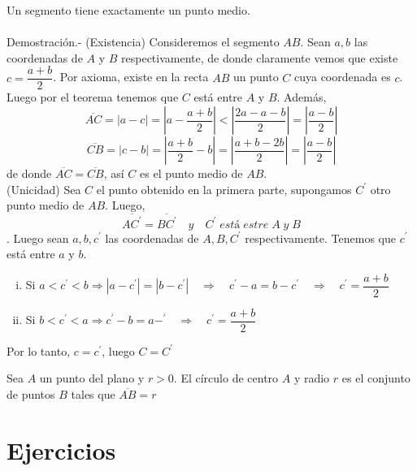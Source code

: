     \begin{teo}
	Un segmento tiene exactamente un punto medio.\\\\
	    Demostración.-\; (Existencia) Consideremos el segmento $AB$. Sean $a,b$ las coordenadas de $A$ y $B$ respectivamente, de donde claramente vemos que existe $c=\dfrac{a+b}{2}$. Por axioma, existe en la recta $AB$ un punto $C$ cuya coordenada es $c$. Luego por el teorema tenemos que $C$ está entre $A$ y $B$. Además, 
	    $$\overline{AC}=|a-c| = \left| a - \dfrac{a+b}{2}\right| < \left| \dfrac{2a - a -b}{2}\right| = \left| \dfrac{a-b}{2} \right|$$
	    $$\overline{CB} = |c-b| = \left| \dfrac{a+b}{2} - b \right| = \left| \dfrac{a+b-2b}{2} \right| = \left| \dfrac{a-b}{2}\right|$$ de donde $\overline{AC} = \overline{CB}$, así $C$ es el punto medio de $AB$.\\
	    (Unicidad) Sea $C$ el punto obtenido en la primera parte, supongamos $C^{'}$ otro punto medio de $AB$. Luego, $$\overline{AC^{'}} = \overline{BC^{'}} \quad y \quad C^{'} \; está \; estre \; A \; y \;B$$.
	    Luego sean $a,b,c^{'}$ las coordenadas de $A,B,C^{'}$ respectivamente. Tenemos que $c^{'}$ está entre $a$ y $b$.
	    \begin{enumerate}[i)]
		\item Si $a<c^{'}<b \Rightarrow |a-c^{'}|=|b-c^{'}| \quad \Rightarrow \quad c^{'} - a = b - c^{'} \quad \Rightarrow \quad c^{'} = \dfrac{a+b}{2}$
		\item Si $b<c^{'}<a \Rightarrow c^{'}-b=a-^{'} \quad \Rightarrow \quad c^{'} = \dfrac{a+b}{2}$
	    \end{enumerate}
	    Por lo tanto, $c=c^{'}$, luego $C=C^{'}$
    \end{teo}

\begin{tcolorbox}[colframe=white]
    \begin{def.}
	Sea $A$ un punto del plano y $r>0$. El círculo de centro $A$ y radio $r$ es el conjunto de puntos $B$ tales que $\overline{AB}=r$
    \end{def.}
\end{tcolorbox}

\section{Ejercicios}

